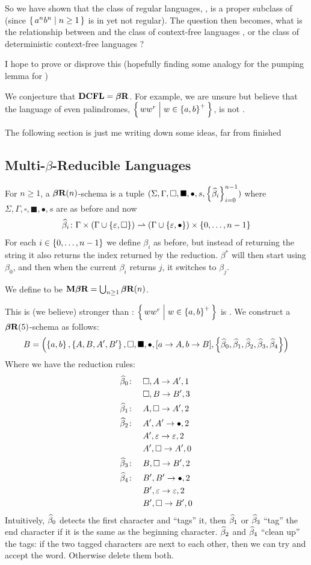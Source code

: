 \documentclass{llncs}
\newcommand{\ari}[1]{{\begin{mdframed}[linecolor=blue]{\color{blue}#1}\end{mdframed}}}
\begin{document}
So we have shown that the class of regular languages, \REG, is a proper subclass of \BR{} (since $\set{a^nb^n}[n\geq1]$ is in \BR{} yet not regular).
The question then becomes, what is the relationship between \BR{} and the class of context-free languages \CFL{}, or the class of deterministic context-free languages \DCFL?

\ari{I hope to prove or disprove this (hopefully finding some analogy for the pumping lemma for \BR)}
We conjecture that $\hbox{{\bf DCFL}}=\hbox{{\bf$\boldsymbol{\beta}$R}}$.
For example, we are unsure but believe that the language of even palindromes, $\set{ww^r}[w\in\set{a,b}^+]$, is not \BR.

\ari{The following section is just me writing down some ideas, far from finished}

\subsection{Multi-$\beta$-Reducible Languages}

For $n\geq1$, a $\hbox{{\bf$\boldsymbol{\beta}$R}}(n)$-schema is a tuple $(\Sigma,\Gamma,\square,\blacksquare,\bullet,s,\set{\hb_i}_{i=0}^{n-1})$ where $\Sigma,\Gamma,\square,\blacksquare,\bullet,s$ are as before and now
\[ \hb_i\colon\Gamma\times(\Gamma\cup\set{\epsilon,\square})\partial(\Gamma\cup\set{\epsilon,\bullet})\times\set{0,\dots,n-1} \]
For each $i\in\set{0,\dots,n-1}$ we define $\beta_i$ as before, but instead of returning the string it also returns the index returned by the reduction.
$\beta^*$ will then start using $\beta_0$, and then when the current $\beta_i$ returns $j$, it switches to $\beta_j$.

We define \MBR{} to be $\hbox{{\bf M$\boldsymbol{\beta}$R}}=\bigcup_{n\geq1}\hbox{{\bf$\boldsymbol{\beta}$R}}(n)$.

This is (we believe) stronger than \BR: $\set{ww^r}[w\in\set{a,b}^+]$ is \MBR.
We construct a $\hbox{{\bf$\boldsymbol{\beta}$R}}(5)$-schema as follows:
\[ B = \parens{\set{a,b},\set{A,B,A',B'},\square,\blacksquare,\bullet,[a\to A,b\to B],\set{\hb_0,\hb_1,\hb_2,\hb_3,\hb_4}} \]
Where we have the reduction rules:
\begin{align*}
    \widehat\beta_0\colon\quad& \square,A\to A',1\\
        & \square,B\to B',3\\
    \widehat\beta_1\colon\quad& A,\square\to A',2\\
    \widehat\beta_2\colon\quad& A',A'\to\bullet,2\\
        &A',\varepsilon\to\varepsilon,2\\
        &A',\square\to A',0\\
    \widehat\beta_3\colon\quad& B,\square\to B',2\\
    \widehat\beta_4\colon\quad& B',B'\to\bullet,2\\
        &B',\varepsilon\to\varepsilon,2\\
        &B',\square\to B',0\\
\end{align*}
Intuitively, $\widehat\beta_0$ detects the first character and ``tags'' it, then $\widehat\beta_1$ or $\widehat\beta_3$ ``tag'' the end character if it is the same as the beginning character.
$\widehat\beta_2$ and $\widehat\beta_4$ ``clean up'' the tags: if the two tagged characters are next to each other, then we can try and accept the word.
Otherwise delete them both.
\end{document}
